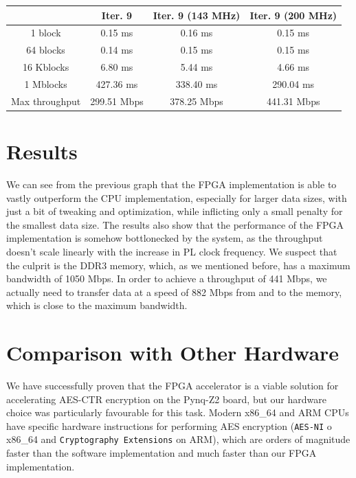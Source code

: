 \documentclass[12pt,oneside,a4paper]{article}
\begin{document}
\begin{table}[h!]
	\centering
	\begin{tabular}{cccc}
		\toprule
		 & Iter. 9 & Iter. 9 (143 MHz) & Iter. 9 (200 MHz) \\
		\midrule
		1 block & 0.15 ms & 0.16 ms & 0.15 ms \\
		64 blocks & 0.14 ms & 0.15 ms & 0.15 ms \\
		16 Kblocks & 6.80 ms & 5.44 ms & 4.66 ms \\
		1 Mblocks & 427.36 ms & 338.40 ms & 290.04 ms \\
		Max throughput & 299.51 Mbps & 378.25 Mbps & 441.31 Mbps \\
		\bottomrule
	\end{tabular}
\end{table}

\section{Results} \label{sec:results}
We can see from the previous graph that the FPGA implementation is able to vastly outperform the CPU implementation, especially for larger data sizes, with just a bit of tweaking and optimization, while inflicting only a small penalty for the smallest data size.
The results also show that the performance of the FPGA implementation is somehow bottlonecked by the system, as the throughput doesn't scale linearly with the increase in PL clock frequency.
We suspect that the culprit is the DDR3 memory, which, as we mentioned before, has a maximum bandwidth of 1050 Mbps. In order to achieve a throughput of 441 Mbps, we actually need to transfer data at a speed of 882 Mbps from and to the memory, which is close to the maximum bandwidth.

\section{Comparison with Other Hardware} \label{sec:conclusions}
We have successfully proven that the FPGA accelerator is a viable solution for accelerating AES-CTR encryption on the Pynq-Z2 board, but our hardware choice was particularly favourable for this task.
Modern x86\_64 and ARM CPUs have specific hardware instructions for performing AES encryption (\texttt{AES-NI} \cite{aes:aes-ni} o x86\_64 and \texttt{Cryptography Extensions} \cite{aes:arm-extensions} on ARM), which are orders of magnitude faster than the software implementation and much faster than our FPGA implementation.
\end{document}
